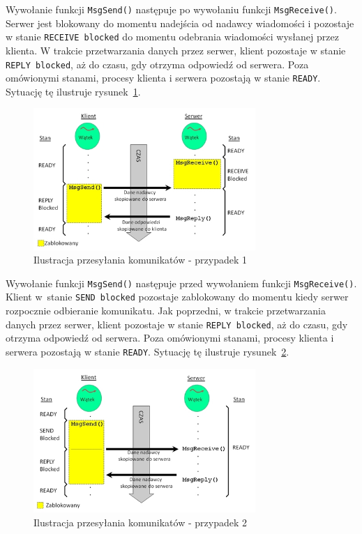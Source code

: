 \begin{myenumerate} 
\item Wywołanie funkcji \lstinline[style=MyCStyle]{MsgSend()} następuje po wywołaniu funkcji \lstinline[style=MyCStyle]{MsgReceive()}. Serwer jest blokowany do momentu nadejścia od nadawcy wiadomości i pozostaje w stanie \lstinline[style=MyCStyle]{RECEIVE blocked} do momentu odebrania wiadomości wysłanej przez klienta. W trakcie przetwarzania danych przez serwer, klient pozostaje w stanie \lstinline[style=MyCStyle]{REPLY blocked}, aż do czasu, gdy otrzyma odpowiedź od serwera. Poza omówionymi stanami, procesy klienta i serwera pozostają w stanie \lstinline[style=MyCStyle]{READY}. Sytuację tę ilustruje rysunek~\ref{fig:Msg1}. 

\begin{figure}[!h]
\centering
\includegraphics[width=0.75\textwidth]{img/Msg1}
\caption{Ilustracja przesyłania komunikatów - przypadek 1}
\label{fig:Msg1}
\end{figure}

\item Wywołanie funkcji \lstinline[style=MyCStyle]{MsgSend()} następuje przed wywołaniem funkcji \lstinline[style=MyCStyle]{MsgReceive()}. Klient w~stanie \lstinline[style=MyCStyle]{SEND blocked} pozostaje zablokowany  do momentu kiedy serwer rozpocznie odbieranie komunikatu. Jak poprzedni, w trakcie przetwarzania danych przez serwer, klient pozostaje w stanie \lstinline[style=MyCStyle]{REPLY blocked}, aż do czasu, gdy otrzyma odpowiedź od serwera. Poza omówionymi stanami, procesy klienta i serwera pozostają w stanie \lstinline[style=MyCStyle]{READY}. Sytuację tę ilustruje rysunek~\ref{fig:Msg2}. 

\begin{figure}[!h]
\centering
\includegraphics[width=0.75\textwidth]{img/Msg2}
\caption{Ilustracja przesyłania komunikatów - przypadek 2}
\label{fig:Msg2}
\end{figure}
\end{myenumerate} 

